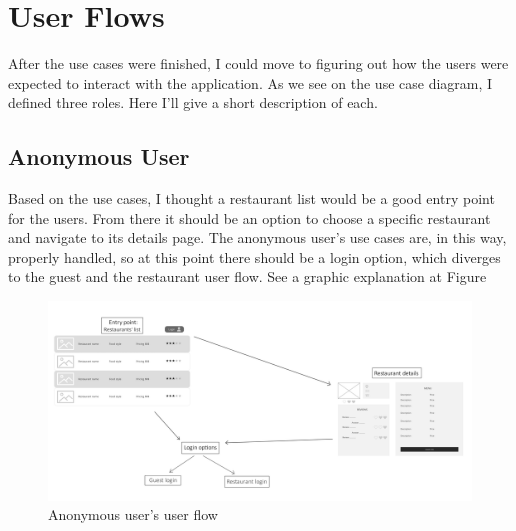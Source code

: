 \section{User Flows}

After the use cases were finished, I could move to figuring out how the users were expected to interact with the application. As we see on the use case diagram, I defined three roles. Here I'll give a short description of each.
\subsection{Anonymous User}\label{AnonUserflow}
 Based on the use cases, I thought a restaurant list would be a good entry point for the users. From there it should be an option to choose a specific restaurant and navigate to its details page. The anonymous user's use cases are, in this way, properly handled, so at this point there should be a login option, which diverges to the guest and the restaurant user flow. See a graphic explanation at Figure 
\begin{figure}[!ht]
	\centering
	\includegraphics[width=150mm, keepaspectratio]{figures/UIsAnon.png}
	\caption{Anonymous user's user flow} 
	\label{fig:UIsAnon}
\end{figure}
